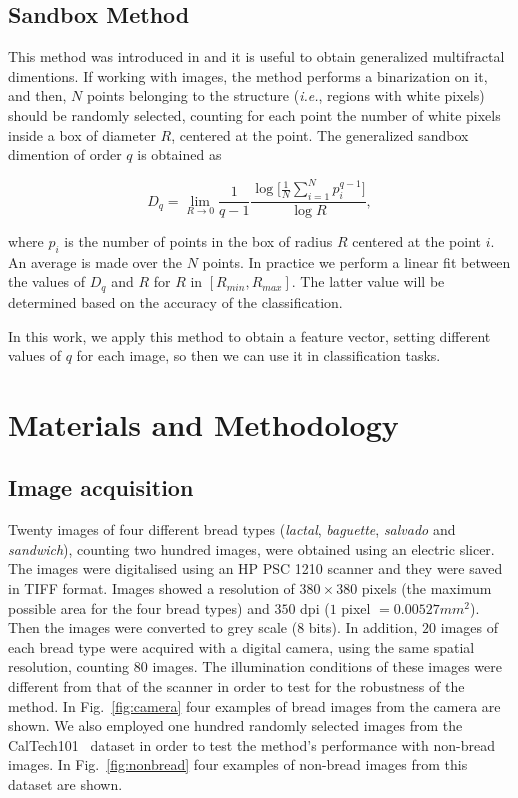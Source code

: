 \documentclass[oneside,a4paper,english,links]{article}
\begin{document}
\subsection{Sandbox Method}
This method was introduced in \cite{Tel89} and it is useful to obtain generalized multifractal dimentions. If working with images, the method performs a binarization on it, and then, $N$ points belonging to the structure ({\em i.e.}, regions with white pixels) should be randomly selected, counting for each point the number of white pixels inside a box of diameter $R$, centered at the point. The generalized sandbox dimention of order $q$ is obtained as \cite{Bert94}

\begin{equation}
D_{q} = \lim_{R\rightarrow0}{\frac{1}{q-1} \frac{\log \bigg \lbrack\frac{1}{N}\displaystyle \sum_{i=1}^{N}{p_{i}^{q-1}}\bigg \rbrack}{\log R}},
\end{equation}

where $p_{i}$ is the number of points in the box of radius $R$ centered at the point $i$. An average is made over the $N$ points.
In practice we perform a linear fit between the values of $D_{q}$ and $R$ for $R$ in $[R_{min}, R_{max}]$. The latter value will be determined based on the accuracy of the classification.

In this work, we apply this method to obtain a feature vector, setting different values of $q$ for each image, so then we can use it in classification tasks.

\section{Materials and Methodology}

\subsection{Image acquisition}
Twenty images of four different bread types ({\em lactal}, {\em baguette}, {\em salvado} and {\em sandwich}), counting two hundred images, were obtained using an electric slicer. The images were digitalised using an HP PSC 1210 scanner and they were saved in TIFF format. Images showed a resolution of $380 \times 380$ pixels (the maximum possible area for the four bread types) and $350$ dpi ($1$ pixel $= 0.00527 mm^{2}$). Then the images were converted to grey scale ($8$ bits). In addition, $20$ images of each bread type were acquired with a digital camera, using the same spatial resolution, counting $80$ images. The illumination conditions of these images were different from that of the scanner in order to test for the robustness of the method. In Fig.~\ref{fig:camera} four examples of bread images from the camera are shown. We also employed one hundred randomly selected images from the CalTech101~\cite{FeiFei04} dataset in order to test the method's performance with non-bread images. In Fig.~\ref{fig:nonbread} four examples of non-bread images from this dataset are shown. 
\end{document}
